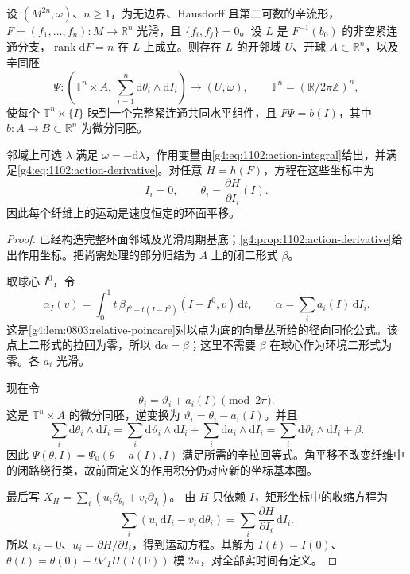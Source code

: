 \begin{theorem}\label{g4:thm:1102:action-angle}
	设 \((M^{2n},\omega)\)、\(n\ge1\)，为无边界、Hausdorff 且第二可数的辛流形，\(F=(f_1,\ldots,f_n):M\to\mathbb R^n\) 光滑，且 \(\{f_i,f_j\}=0\)。设 \(L\) 是 \(F^{-1}(b_0)\) 的非空紧连通分支，\(\operatorname{rank}\mathrm{d}F=n\) 在 \(L\) 上成立。则存在 \(L\) 的开邻域 \(U\)、开球 \(A\subset\mathbb R^n\)，以及辛同胚
	\begin{equation}\label{g4:eq:1102:action-angle-map}
		\Psi:\left(\mathbb T^n\times A,\
		\sum_{i=1}^n\mathrm{d}\theta_i\wedge\mathrm{d}I_i\right)
		\longrightarrow(U,\omega),\qquad
		\mathbb T^n=(\mathbb R/2\pi\mathbb Z)^n,
	\end{equation}
	使每个 \(\mathbb T^n\times\{I\}\) 映到一个完整紧连通共同水平组件，且 \(F\Psi=b(I)\)，其中 \(b:A\to B\subset\mathbb R^n\) 为微分同胚。

	邻域上可选 \(\lambda\) 满足 \(\omega=-\mathrm{d}\lambda\)，作用变量由\eqref{g4:eq:1102:action-integral}给出，并满足\eqref{g4:eq:1102:action-derivative}。对任意 \(H=h(F)\)，方程在这些坐标中为
	\begin{equation}\label{g4:eq:1102:linear-hamilton-flow}
		\dot I_i=0,\qquad
		\dot\theta_i=\frac{\partial H}{\partial I_i}(I).
	\end{equation}
	因此每个纤维上的运动是速度恒定的环面平移。
\end{theorem}
\begin{proof}
	已经构造完整环面邻域及光滑周期基底；\cref{g4:prop:1102:action-derivative}给出作用坐标。把尚需处理的部分归结为 \(A\) 上的闭二形式 \(\beta\)。

	取球心 \(I^0\)，令
	\[
		\alpha_I(v)=\int_0^1t\,
		\beta_{I^0+t(I-I^0)}(I-I^0,v)\,\mathrm{d}t,
		\qquad
		\alpha=\sum_i a_i(I)\,\mathrm{d}I_i.
	\]
	这是\cref{g4:lem:0803:relative-poincare}对以点为底的向量丛所给的径向同伦公式。该点上二形式的拉回为零，所以 \(\mathrm{d}\alpha=\beta\)；这里不需要 \(\beta\) 在球心作为环境二形式为零。各 \(a_i\) 光滑。

	现在令
	\[
		\theta_i=\vartheta_i+a_i(I)\pmod{2\pi}.
	\]
	这是 \(\mathbb T^n\times A\) 的微分同胚，逆变换为
	\(\vartheta_i=\theta_i-a_i(I)\)。并且
	\[
		\sum_i\mathrm{d}\theta_i\wedge\mathrm{d}I_i
		=\sum_i\mathrm{d}\vartheta_i\wedge\mathrm{d}I_i
		 +\sum_i\mathrm{d}a_i\wedge\mathrm{d}I_i
		=\sum_i\mathrm{d}\vartheta_i\wedge\mathrm{d}I_i+\beta.
	\]
	因此 \(\Psi(\theta,I)=\Psi_0(\theta-a(I),I)\) 满足所需的辛拉回等式。角平移不改变纤维中的闭路绕行类，故前面定义的作用积分仍对应新的坐标基本圈。

	最后写
	\(X_H=\sum_i(u_i\partial_{\theta_i}+v_i\partial_{I_i})\)。
	由 \(H\) 只依赖 \(I\)，矩形坐标中的收缩方程为
	\[
		\sum_i(u_i\,\mathrm{d}I_i-v_i\,\mathrm{d}\theta_i)
		=\sum_i\frac{\partial H}{\partial I_i}\,\mathrm{d}I_i.
	\]
	所以 \(v_i=0\)、\(u_i=\partial H/\partial I_i\)，得到运动方程。其解为
	\(I(t)=I(0)\)、\(\theta(t)=\theta(0)+t\nabla_IH(I(0))\) 模 \(2\pi\)，对全部实时间有定义。
\end{proof}

